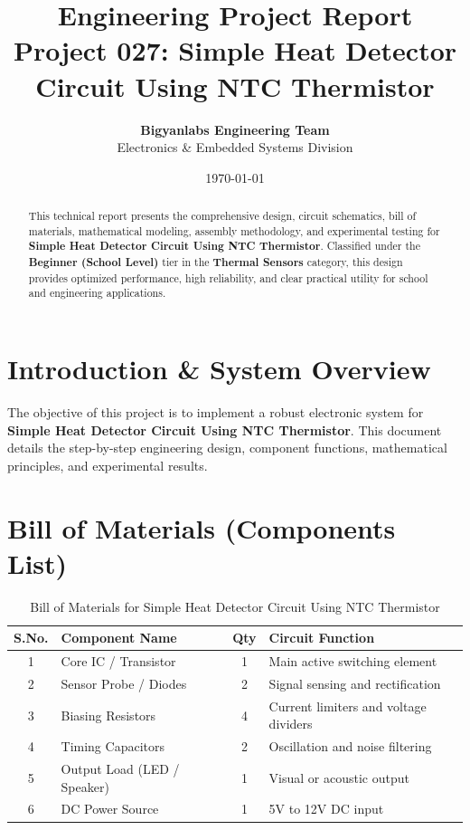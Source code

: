 \documentclass[11pt,a4paper]{article}
\title{\textbf{\Huge Engineering Project Report}\\[0.5em] \Large Project 027: Simple Heat Detector Circuit Using NTC Thermistor}
\author{\textbf{Bigyanlabs Engineering Team}\\ Electronics \& Embedded Systems Division}
\date{\today}
\begin{document}
\maketitle
\thispagestyle{empty}

\begin{abstract}
This technical report presents the comprehensive design, circuit schematics, bill of materials, mathematical modeling, assembly methodology, and experimental testing for \textbf{Simple Heat Detector Circuit Using NTC Thermistor}. Classified under the \textbf{Beginner (School Level)} tier in the \textbf{Thermal Sensors} category, this design provides optimized performance, high reliability, and clear practical utility for school and engineering applications.
\end{abstract}

\newpage
\tableofcontents
\newpage

\section{Introduction \& System Overview}
The objective of this project is to implement a robust electronic system for \textbf{Simple Heat Detector Circuit Using NTC Thermistor}. This document details the step-by-step engineering design, component functions, mathematical principles, and experimental results.

\section{Bill of Materials (Components List)}
\begin{table}[h!]
\centering
\caption{Bill of Materials for Simple Heat Detector Circuit Using NTC Thermistor}
\vspace{0.5em}
\begin{tabular}{clcp{7cm}}
\toprule
\textbf{S.No.} & \textbf{Component Name} & \textbf{Qty} & \textbf{Circuit Function} \\
\midrule
1 & Core IC / Transistor & 1 & Main active switching element \\
2 & Sensor Probe / Diodes & 2 & Signal sensing and rectification \\
3 & Biasing Resistors & 4 & Current limiters and voltage dividers \\
4 & Timing Capacitors & 2 & Oscillation and noise filtering \\
5 & Output Load (LED / Speaker) & 1 & Visual or acoustic output \\
6 & DC Power Source & 1 & 5V to 12V DC input \\
\bottomrule
\end{tabular}
\end{table}
\end{document}
